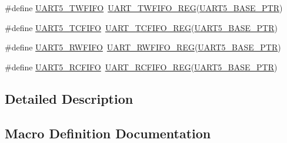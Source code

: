 \begin{DoxyCompactItemize}
\item 
\#define \hyperlink{group___u_a_r_t___register___accessor___macros_ga13f363bb4b0df38eea17350b01c9701a}{U\+A\+R\+T5\+\_\+\+T\+W\+F\+I\+FO}~\hyperlink{group___u_a_r_t___register___accessor___macros_ga6204d5850da243402d242d414cdb66f0}{U\+A\+R\+T\+\_\+\+T\+W\+F\+I\+F\+O\+\_\+\+R\+EG}(\hyperlink{group___u_a_r_t___peripheral_gace0110558cde93abab79b033e3caf755}{U\+A\+R\+T5\+\_\+\+B\+A\+S\+E\+\_\+\+P\+TR})
\item 
\#define \hyperlink{group___u_a_r_t___register___accessor___macros_ga79218a8604525028728879cb322eb0f9}{U\+A\+R\+T5\+\_\+\+T\+C\+F\+I\+FO}~\hyperlink{group___u_a_r_t___register___accessor___macros_ga3c989ec09106d40a7499376ee50043cb}{U\+A\+R\+T\+\_\+\+T\+C\+F\+I\+F\+O\+\_\+\+R\+EG}(\hyperlink{group___u_a_r_t___peripheral_gace0110558cde93abab79b033e3caf755}{U\+A\+R\+T5\+\_\+\+B\+A\+S\+E\+\_\+\+P\+TR})
\item 
\#define \hyperlink{group___u_a_r_t___register___accessor___macros_ga766ae030b47dba2e59e05f311eb7b5fc}{U\+A\+R\+T5\+\_\+\+R\+W\+F\+I\+FO}~\hyperlink{group___u_a_r_t___register___accessor___macros_ga3835d8ca2bff395228fd298041588e27}{U\+A\+R\+T\+\_\+\+R\+W\+F\+I\+F\+O\+\_\+\+R\+EG}(\hyperlink{group___u_a_r_t___peripheral_gace0110558cde93abab79b033e3caf755}{U\+A\+R\+T5\+\_\+\+B\+A\+S\+E\+\_\+\+P\+TR})
\item 
\#define \hyperlink{group___u_a_r_t___register___accessor___macros_gab185e827477a31eb3381683fbf1bd3ab}{U\+A\+R\+T5\+\_\+\+R\+C\+F\+I\+FO}~\hyperlink{group___u_a_r_t___register___accessor___macros_ga45b1614543eafe052567800963874056}{U\+A\+R\+T\+\_\+\+R\+C\+F\+I\+F\+O\+\_\+\+R\+EG}(\hyperlink{group___u_a_r_t___peripheral_gace0110558cde93abab79b033e3caf755}{U\+A\+R\+T5\+\_\+\+B\+A\+S\+E\+\_\+\+P\+TR})
\end{DoxyCompactItemize}


\subsection{Detailed Description}


\subsection{Macro Definition Documentation}
